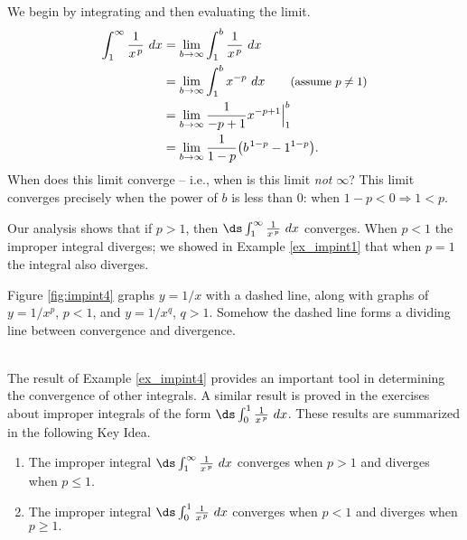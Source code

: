 {We begin by integrating and then evaluating the limit.
\begin{align*}
\int_1^\infty \frac1{x\hskip1pt ^p}\ dx &=	\lim_{b\to\infty}\int_1^b\frac1{x\hskip1pt ^p}\ dx\\
		&=	\lim_{b\to\infty}\int_1^b x^{-p}\ dx \qquad \text{\small (assume $p\neq 1$)}\\
		&= \lim_{b\to\infty} \frac{1}{-p+1}x^{-p+1}\Big|_1^b\\
		&= \lim_{b\to\infty} \frac{1}{1-p}\big(b\hskip1pt^{1-p}-1^{1-p}\big).\\
\end{align*}
When does this limit converge -- i.e., when is this limit \textit{not} $\infty$? This limit converges precisely when the power of $b$ is less than 0: when $1-p<0 \Rightarrow 1<p$. 


Our analysis shows that if $p>1$, then $\ds\int_1^\infty \frac1{x\hskip1pt ^p}\ dx $ converges. When $p<1$ the improper integral diverges; we showed in Example \ref{ex_impint1} that when $p=1$ the integral also diverges. 

Figure \ref{fig:impint4} graphs $y=1/x$ with a dashed line, along with graphs of $y=1/x^p$, $p<1$, and $y=1/x^q$, $q>1$. Somehow the dashed line forms a dividing line between convergence and divergence. %
}\\

The result of Example \ref{ex_impint4} provides an important tool in determining the convergence of other integrals. A similar result is proved in the exercises about improper integrals of the form $\ds \int_0^1\frac1{x\hskip1pt ^p}\ dx$. These results are summarized in the following Key Idea.


\setboxwidth{80pt}%
{\begin{enumerate}
\item		The improper integral $\ds \int_1^\infty\frac1{x\hskip1pt ^p}\ dx$ converges when $p>1$ and diverges when $p\leq 1.$
\item		The improper integral $\ds \int_0^1\frac1{x\hskip1pt ^p}\ dx$ converges when $p<1$ and diverges when $p\geq 1.$
\end{enumerate}
}
\restoreboxwidth


